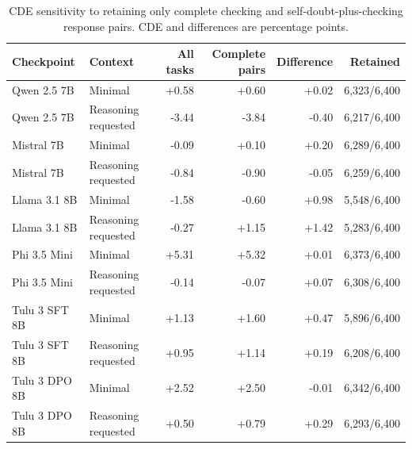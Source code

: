 \begin{table}[t]
\centering\scriptsize
\caption{CDE sensitivity to retaining only complete checking and self-doubt-plus-checking response pairs. CDE and differences are percentage points.}
\label{tab:complete-pairs}
\begin{tabular}{@{}llrrrr@{}}
\toprule
Checkpoint & Context & All tasks & Complete pairs & Difference & Retained \\
\midrule
Qwen 2.5 7B & Minimal & +0.58 & +0.60 & +0.02 & 6,323/6,400 \\
Qwen 2.5 7B & Reasoning requested & -3.44 & -3.84 & -0.40 & 6,217/6,400 \\
Mistral 7B & Minimal & -0.09 & +0.10 & +0.20 & 6,289/6,400 \\
Mistral 7B & Reasoning requested & -0.84 & -0.90 & -0.05 & 6,259/6,400 \\
Llama 3.1 8B & Minimal & -1.58 & -0.60 & +0.98 & 5,548/6,400 \\
Llama 3.1 8B & Reasoning requested & -0.27 & +1.15 & +1.42 & 5,283/6,400 \\
Phi 3.5 Mini & Minimal & +5.31 & +5.32 & +0.01 & 6,373/6,400 \\
Phi 3.5 Mini & Reasoning requested & -0.14 & -0.07 & +0.07 & 6,308/6,400 \\
Tulu 3 SFT 8B & Minimal & +1.13 & +1.60 & +0.47 & 5,896/6,400 \\
Tulu 3 SFT 8B & Reasoning requested & +0.95 & +1.14 & +0.19 & 6,208/6,400 \\
Tulu 3 DPO 8B & Minimal & +2.52 & +2.50 & -0.01 & 6,342/6,400 \\
Tulu 3 DPO 8B & Reasoning requested & +0.50 & +0.79 & +0.29 & 6,293/6,400 \\
\bottomrule
\end{tabular}
\end{table}
